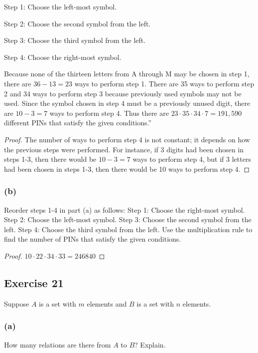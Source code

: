 \documentclass[14pt]{extarticle}
\newcommand{\cy}{\color{cyan}}
\begin{document}
Step 1: Choose the left-most symbol.

Step 2: Choose the second symbol from the left.

Step 3: Choose the third symbol from the left.

Step 4: Choose the right-most symbol.

Because none of the thirteen letters from A through M may be chosen in step 1, there are \(36 - 13 = 23\) ways to 
perform step 1. There are 35 ways to perform step 2 and 34 ways to perform step 3 because previously used symbols may 
not be used. Since the symbol chosen in step 4 must be a previously unused digit, there are \(10 - 3 = 7\) ways to 
perform step 4. Thus there are \(23 \cdot 35 \cdot 34 \cdot 7 = 191,590\) different PINs that satisfy the given 
conditions.”

\begin{proof}
The number of ways to perform step 4 is not constant; it depends on how the previous steps were performed. For 
instance, if 3 digits had been chosen in steps 1-3, then there would be \(10 - 3 = 7\) ways to perform step 4, but 
if 3 letters had been chosen in steps 1-3, then there would be 10 ways to perform step 4.
\end{proof}

\subsubsection{(b)}
Reorder steps 1-4 in part (a) as follows: {\cy Step 1:} Choose the right-most symbol. {\cy Step 2:} Choose the 
left-most symbol. {\cy Step 3:} Choose the second symbol from the left. {\cy Step 4:} Choose the third symbol from 
the left. Use the multiplication rule to find the number of PINs that satisfy the given conditions.

\begin{proof}
\(10 \cdot 22 \cdot 34 \cdot 33 = 246840\)
\end{proof}

\subsection{Exercise 21}
Suppose $A$ is a set with $m$ elements and $B$ is a set with $n$ elements.

\subsubsection{(a)}
How many relations are there from $A$ to $B$? Explain.
\end{document}
